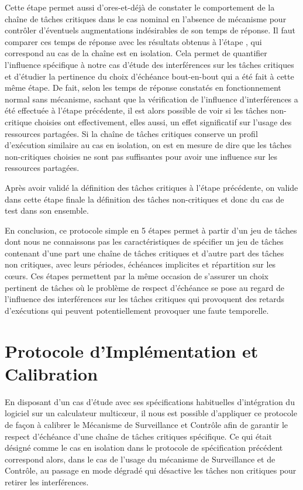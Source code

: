 \documentclass[french, a4paper, 11pt, twoside, pdftex]{StyleThese}
\begin{document}
		Cette étape permet aussi d'ores-et-déjà de constater le comportement de la chaîne de tâches critiques dans le cas nominal en l'absence de mécanisme pour contrôler d'éventuels augmentations indésirables de son temps de réponse. Il faut comparer ces temps de réponse avec les résultats obtenus à l'étape , qui correspond au cas de la chaîne est en isolation. Cela permet de quantifier l'influence spécifique à notre cas d'étude des interférences sur les tâches critiques et d'étudier la pertinence du choix d'échéance bout-en-bout qui a été fait à cette même étape. De fait, selon les temps de réponse constatés en fonctionnement normal sans mécanisme, sachant que la vérification de l'influence d'interférences a été effectuée à l'étape précédente, il est alors possible de voir si les tâches non-critique choisies ont effectivement, elles aussi, un effet significatif sur l'usage des ressources partagées. Si la chaîne de tâches critiques conserve un profil d'exécution similaire au cas en isolation, on est en mesure de dire que les tâches non-critiques choisies ne sont pas suffisantes pour avoir une influence sur les ressources partagées.
		
		Après avoir validé la définition des tâches critiques à l'étape précédente, on valide dans cette étape finale la définition des tâches non-critiques et donc du cas de test dans son ensemble.
		
		
		En conclusion, ce protocole simple en 5 étapes permet à partir d'un jeu de tâches dont nous ne connaissons pas les caractéristiques de spécifier un jeu de tâches contenant d'une part une chaîne de tâches critiques et d'autre part des tâches non critiques, avec leurs périodes, échéances implicites et répartition sur les cœurs. Ces étapes permettent par la même occasion de s'assurer un choix pertinent de tâches où le problème de respect d'échéance se pose au regard de l'influence des interférences sur les tâches critiques qui provoquent des retards d'exécutions qui peuvent potentiellement provoquer une faute temporelle.
                	
                	
\section{Protocole d'Implémentation et Calibration}

		En disposant d'un cas d'étude avec ses spécifications habituelles d'intégration du logiciel sur un calculateur multicœur, il nous est possible d'appliquer ce protocole de façon à calibrer le Mécanisme de Surveillance et Contrôle afin de garantir le respect d'échéance d'une chaîne de tâches critiques spécifique. Ce qui était désigné comme le cas en isolation dans le protocole de spécification précédent correspond alors, dans le cas de l'usage du mécanisme de Surveillance et de Contrôle, au passage en mode dégradé qui désactive les tâches non critiques pour retirer les interférences.
		
\end{document}
